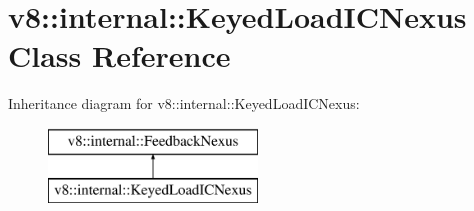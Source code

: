 \hypertarget{classv8_1_1internal_1_1_keyed_load_i_c_nexus}{}\section{v8\+:\+:internal\+:\+:Keyed\+Load\+I\+C\+Nexus Class Reference}
\label{classv8_1_1internal_1_1_keyed_load_i_c_nexus}
Inheritance diagram for v8\+:\+:internal\+:\+:Keyed\+Load\+I\+C\+Nexus\+:\begin{figure}[H]
\begin{center}
\leavevmode
\includegraphics[height=2.000000cm]{classv8_1_1internal_1_1_keyed_load_i_c_nexus}
\end{center}
\end{figure}
